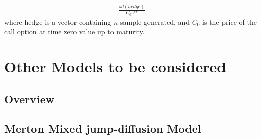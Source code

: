 \documentclass[12pt]{report}
\begin{document}
\begin{align}
  \frac{sd(hedge)}{C_0 e ^{r T}}
  \label{bsm:delta:hedge:perf}
\end{align}
where hedge is a vector containing $n$ sample generated, and $C_0$ is the price of the call option at time zero value up to maturity.
































%
%
\chapter{Other Models to be considered}
\label{cha:OtherModel}


\section{Overview}
\label{sub:OverviewJump}

\section{Merton Mixed jump-diffusion Model}
\label{sec:other:merton}
\end{document}
